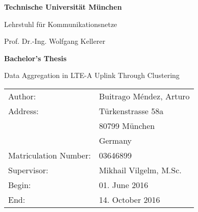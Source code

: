 \documentclass[12pt,a4paper]{report}
\begin{document}
\thispagestyle{empty}
\newpage

\vspace{5cm}
\begin{center}
    \epsfxsize=4cm
\end{center}

\parbox{15cm}{\begin{center} {\sf\bf 
                               \Large  Technische Universität München
                                \smallskip

                               \Large Lehrstuhl für Kommunikationsnetze
                               \smallskip
                              }

                              {\sf \large Prof. Dr.-Ing. Wolfgang Kellerer} 
              \end{center}}  %

\vspace{4cm}

\begin{center}
        {\bf\Huge Bachelor's Thesis} %
\end{center}

\begin{center}
        \settowidth{\baselineskip}{0.4cm}
        {\LARGE 
        Data Aggregation in LTE-A Uplink Through Clustering
        }
\end{center}

\vfill         
{\settowidth{\baselineskip}{0.2cm}
\large\begin{tabular}[l]{ll}
Author: & Buitrago M\'{e}ndez, Arturo\\
Address: & T\"{u}rkenstrasse 58a\\
         & 80799 M\"{u}nchen\\
         & Germany\\
Matriculation Number: & 03646899\\
Supervisor: & Mikhail Vilgelm, M.Sc.\\
Begin: & 01. June 2016\\
End: & 14. October 2016
\end{tabular}}




\tableofcontents  

\end{document}

